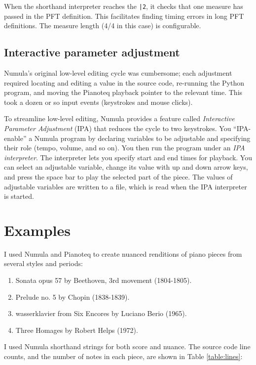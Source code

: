 \documentclass[letterpaper, 12pt]{article}
\begin{document}
When the shorthand interpreter reaches the \texttt{|2},
it checks that one measure has passed in the PFT definition.
This facilitates finding timing errors in long PFT definitions.
The measure length (4/4 in this case) is configurable.

\subsection{Interactive parameter adjustment}

Numula's original low-level editing cycle was cumbersome;
each adjustment required locating and editing a value in the source code,
re-running the Python program,
and moving the Pianoteq playback pointer to the relevant time.
This took a dozen or so input events (keystrokes and mouse clicks).

To streamline low-level editing, Numula provides a feature called
\textit{Interactive Parameter Adjustment} (IPA)
that reduces the cycle to two keystrokes.
You ``IPA-enable'' a Numula program
by declaring variables to be adjustable
and specifying their role (tempo, volume, and so on).
You then run the program under an \textit{IPA interpreter}.
The interpreter lets you specify start and end times for playback.
You can select an adjustable variable,
change its value with up and down arrow keys,
and press the space bar to play the selected part of the piece.
The values of adjustable variables are written to a file,
which is read when the IPA interpreter is started.

\section{Examples}

I used Numula and Pianoteq to create nuanced renditions
of piano pieces from several styles and periods:
\begin{enumerate}
\item Sonata opus 57 by Beethoven, 3rd movement (1804-1805).
\item Prelude no. 5 by Chopin (1838-1839).
\item wasserklavier from Six Encores by Luciano Berio (1965).
\item Three Homages by Robert Helps (1972).
\end{enumerate}

I used Numula shorthand strings for both score and nuance.
The source code line counts, and the number of notes in each piece,
are shown in Table \ref{table:lines}:
\end{document}
